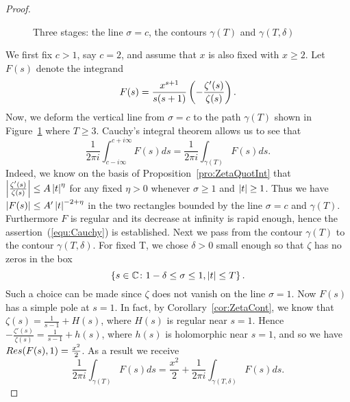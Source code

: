 \begin{proof}
\begin{figure}[!htb]
\caption{Three stages: the line $\sigma = c$, the contours $\gamma(T)$ and $\gamma(T, \delta)$}
\label{fig:ContourGamma2}
\end{figure}
	We first fix $c > 1$, say $c = 2$, and assume that $x$ is also fixed with $x \geq 2$. Let $F(s)$ denote the integrand
\begin{equation*}
	F(s) = \frac{x^{s + 1}}{s(s + 1)} \left(-\frac{\zeta'(s)}{\zeta(s)}\right).
\end{equation*}
	Now, we deform the vertical line from $\sigma = c$ to the path $\gamma(T)$ shown in Figure~\ref{fig:ContourGamma2} where $T \geq 3$. Cauchy's integral theorem allows us to see that
\begin{equation}\label{equ:Cauchy}
	\frac{1}{2 \pi i} \int _{c - i \infty} ^{c + i \infty} F(s) ds = \frac{1}{2 \pi i} \int _{\gamma(T)} F(s) ds.
\end{equation}
	Indeed, we know on the basis of Proposition~\ref{pro:ZetaQuotInt} that $\left|\frac{\zeta'(s)}{\zeta(s)}\right| \leq A\left|t\right|^\eta$ for any fixed $\eta > 0$ whenever $\sigma \geq 1$ and $\left|t\right| \geq 1$. Thus we have $\left|F(s)\right| \leq A'\left|t\right|^{-2 + \eta}$ in the two rectangles bounded by the line $\sigma = c$ and $\gamma(T)$. Furthermore $F$ is regular and its decrease at infinity is rapid enough, hence the assertion~(\ref{equ:Cauchy}) is established.
	Next we pass from the contour $\gamma(T)$ to the contour $\gamma(T, \delta)$. For fixed T, we chose $\delta > 0$ small enough so that $\zeta$ has no zeros in the box
\begin{equation*}
	\left\{s \in \mathbb{C} \colon 1 - \delta \leq \sigma \leq 1, \left|t\right| \leq T\right\}.
\end{equation*}
	Such a choice can be made since $\zeta$ does not vanish on the line $\sigma = 1$. Now $F(s)$ has a simple pole at $s = 1$. In fact, by Corollary~\ref{cor:ZetaCont}, we know that $\zeta(s) = \frac{1}{s - 1} + H(s)$, where $H(s)$ is regular near $s = 1$. Hence $-\frac{\zeta'(s)}{\zeta(s)} =\frac{1}{s - 1} + h(s)$, where $h(s)$ is holomorphic near $s = 1$, and so we have $\mathop{Res}(F(s), 1) = \frac{x^2}{2}$. As a result we receive
\begin{equation*}
	\frac{1}{2 \pi i} \int _{\gamma(T)} F(s) ds = \frac{x^2}{2} + \frac{1}{2 \pi i} \int _{\gamma(T, \delta)} F(s) ds.

\end{equation*}
\end{proof}
